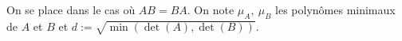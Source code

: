 






On se place dans le cas où $AB=BA$. On note $\mu_A,\: \mu_B$ les polynômes minimaux de $A$ et $B$ et $d:= \sqrt{\min \left(\det(A), \det(B)\right)}.$

